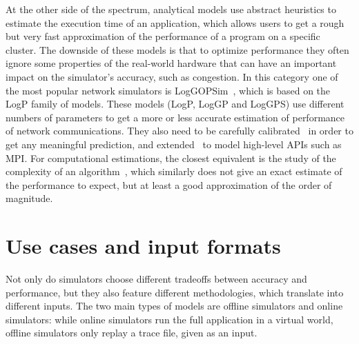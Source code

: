 At the other side of the spectrum, analytical models use abstract heuristics to
estimate the execution time of an application, which allows users to get a rough
but very fast approximation of the performance of a program on a specific
cluster. The downside of these models is that to optimize performance they often
ignore some properties of the real-world hardware that can have an important
impact on the simulator's accuracy, such as congestion. In this category one of
the most popular network simulators is LogGOPSim~\cite{Hoefler2010}, which is
based on the LogP family of models. These models (LogP, LogGP and LogGPS) use
different numbers of parameters to get a more or less accurate estimation of
performance of network communications. They also need to be carefully
calibrated~\cite{Hoefler2007} in order to get any meaningful prediction, and
extended~\cite{Ferreira2018} to model high-level APIs such as MPI. For
computational estimations, the closest equivalent is the study of the complexity
of an algorithm~\cite{Cook1983,Turing1937}, which similarly does not give an
exact estimate of the performance to expect, but at least a good approximation
of the order of magnitude.

\section{Use cases and input formats}

Not only do simulators choose different tradeoffs between accuracy and
performance, but they also feature different methodologies, which translate into
different inputs. The two main types of models are offline simulators and online
simulators: while online simulators run the full application in a virtual world,
offline simulators only replay a trace file, given as an input.

